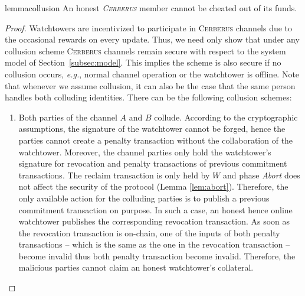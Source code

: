 \documentclass[runningheads]{llncs}
\newcommand{\eg}{{\em e.g.}}
\newcommand{\sys}{\textsc{Cerberus}\xspace}
\begin{document}
\vspace{-4pt}
\begin{restatable}{lemma}{collusion}\label{lem:collusion}
An honest \emph{\sys} member cannot be cheated out of its funds.
\end{restatable}
\begin{proof}
Watchtowers are incentivized to participate in \sys channels due to the occasional rewards on every update.
Thus, we need only show that under any collusion scheme \sys channels remain secure with respect to the system model of Section~\ref{subsec:model}. This implies the scheme is also secure if no collusion occurs, \eg, normal channel operation or the watchtower is offline. Note that whenever we assume collusion, it can also be the case that the same person handles both colluding identities.
There can be the following collusion schemes:
\begin{enumerate}[label=(\roman*)]
    \item Both parties of the channel $A$ and $B$ collude.
    According to the cryptographic assumptions, the signature of the watchtower cannot be forged, hence the parties cannot create a penalty transaction without the collaboration of the watchtower.
    Moreover, the channel parties only hold the watchtower's signature for revocation and penalty transactions of previous commitment transactions. The reclaim transaction is only held by $W$ and phase \textit{Abort} does not affect the security of the protocol (Lemma \ref{lem:abort}). Therefore, the only available action for the colluding parties is to publish a previous commitment transaction on purpose. In such a case, an honest hence online watchtower publishes the corresponding revocation transaction. As soon as the revocation transaction is on-chain, one of the inputs of both penalty transactions -- which is the same as the one in the revocation transaction -- become invalid thus both penalty transaction become invalid. Therefore, the malicious parties cannot claim an honest watchtower's collateral.


\end{enumerate}
\end{proof}
\end{document}
